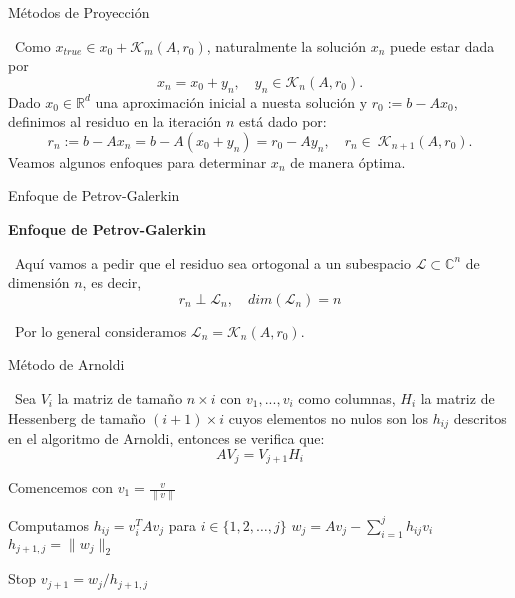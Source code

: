 \documentclass[12pt]{beamer}
\newcommand{\norm}[1]{\left\lVert#1\right\rVert}
\begin{document}
	\begin{frame}{Métodos de Proyección}
		
		\ Como $x_{true} \in x_0 + \mathcal{K}_{m}(A, r_0)$, naturalmente la solución $x_n$ puede estar dada por $$x_n = x_0 + y_n, \quad  y_n \in \mathcal{K}_n(A, r_0).$$ Dado $x_0 \in \mathbb{R}^d$ una aproximación inicial a nuesta solución y $r_0 := b - Ax_0$, definimos al residuo en la iteración $n$ está dado por: $$r_n := b - Ax_n = b - A(x_0 + y_n) = r_0 - Ay_n, \quad r_n\in \ \mathcal{K}_{n+1}(A, r_0).$$ Veamos algunos enfoques para determinar $x_n$ de manera óptima.
		
	\end{frame}
	
	\begin{frame}{Enfoque de Petrov-Galerkin}
		
		\begin{flushleft}
			\textbf{Enfoque de Petrov-Galerkin}
		\end{flushleft}
		\ Aquí vamos a pedir que el residuo sea ortogonal a un subespacio $\mathcal{L} \subset \mathbb{C}^{n}$ de dimensión $n$, es decir, 	$$r_n \perp \mathcal{L}_n, \quad dim(\mathcal{L}_n) = n$$
		
		
		\ Por lo general consideramos $\mathcal{L}_n = \mathcal{K}_{n}(A, r_0)$.
		
	\end{frame}
	
	\begin{frame}{Método de Arnoldi}
		
		\ Sea $V_i$ la matriz de tamaño $n\times i$ con $v_1, ..., v_i$ como columnas, $H_i$ la matriz de Hessenberg de tamaño $(i+1)\times i$ cuyos elementos no nulos son los $h_{ij}$ descritos en el algoritmo de Arnoldi, entonces se verifica que: $$AV_j=V_{j+1}H_i$$
		
		
		
	\end{frame}
	
	\begin{frame}
		
		\begin{algorithm}[H]
			\caption{Algoritmo de Arnoldi}\label{algorithm_1}
			\begin{algorithmic}[1]
				\State Comencemos con $v_1=\frac{v}{\norm{v}}$
				
				\State Computamos $h_{ij} = v_i^TAv_j$ para $i \in \{1, 2, \dots, j\}$
				\State $w_j = Av_j - \sum_{i=1}^j h_{ij} v_i$
				\State $h_{j+1,j} = \|w_j\|_2$
				
				\State Stop
				\EndIf
				\EndFor
				\State $v_{j+1} = w_j / h_{j+1,j}$
			\end{algorithmic}
		\end{algorithm}   
		
	\end{frame}
	
\end{document}
